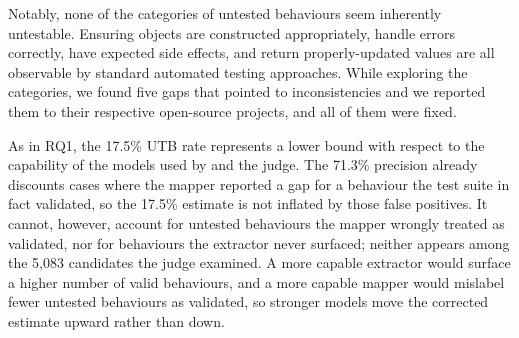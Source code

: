 Notably, none of the categories of untested behaviours seem inherently untestable. Ensuring objects are constructed appropriately, handle errors correctly, have expected side effects, and return properly-updated values are all observable by standard automated testing approaches.
While exploring the categories, we found five 
gaps that pointed to inconsistencies and we reported them to their respective open-source projects, and all of them were fixed.


As in RQ1, the 17.5\% UTB rate represents a lower bound with respect to the capability of the models used by \toolname{} and the judge.
The 71.3\% precision already discounts cases where the mapper reported a gap for a behaviour the test suite in fact validated, so the 17.5\% estimate is not inflated by those false positives.
It cannot, however, account for untested behaviours the mapper wrongly treated as validated, nor for behaviours the extractor never surfaced; neither appears among the 5,083 candidates the judge examined. 
A more capable extractor would surface a higher number of valid behaviours, and a more capable mapper would mislabel fewer untested behaviours as validated, so stronger models move the corrected estimate upward rather than down.


